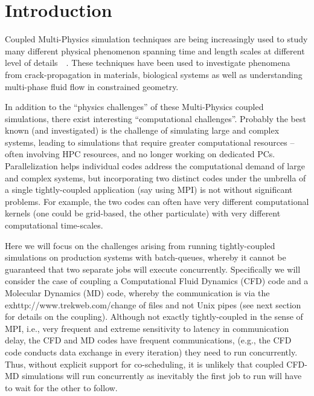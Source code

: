 \documentclass[conference,final]{IEEEtran}
\begin{document}
\section{Introduction}

Coupled Multi-Physics simulation techniques are being increasingly used to study many different physical phenomenon spanning time and length scales at different level of details~\cite{Tai}~\cite{Watanabe}. These techniques have been used to investigate phenomena from crack-propagation in materials, biological systems as well as understanding multi-phase fluid flow in constrained geometry.

In addition to the ``physics challenges'' of these Multi-Physics coupled simulations, there exist interesting ``computational challenges''.  Probably the best known (and investigated) is the challenge of simulating large and complex systems, leading to simulations that require greater computational resources -- often involving HPC resources, and no longer working on dedicated PCs. Parallelization helps individual codes address the computational demand of large and complex systems, but incorporating two distinct codes under the umbrella of a single tightly-coupled application (say using MPI) is not without significant problems. For example, the two codes can often have very different computational kernels (one could be grid-based, the other particulate) with very different computational time-scales.

Here we will focus on the challenges arising from running tightly-coupled simulations on production systems with batch-queues, whereby it cannot be guaranteed that two separate jobs will execute concurrently. Specifically we will consider the case of coupling a Computational Fluid Dynamics (CFD) code and a Molecular Dynamics (MD) code, whereby the communication is via the exhttp://www.trekweb.com/change of files and not Unix pipes (see next section for details on the coupling).  Although not exactly tightly-coupled in the sense of MPI, i.e., very frequent and extreme sensitivity to latency in communication delay, the CFD and MD codes have frequent communications, (e.g., the CFD code conducts data exchange in every iteration) they need to run concurrently.  Thus, without explicit support for co-scheduling, it is unlikely that coupled CFD-MD simulations will run concurrently as inevitably the first job to run will have to wait for the other to follow.
\end{document}
